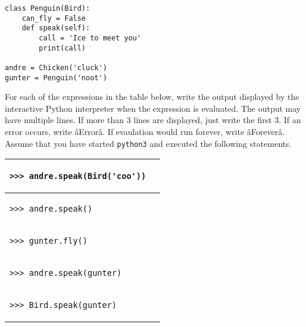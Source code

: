 \documentclass{exam}
\begin{document}
\begin{questions}
\begin{lstlisting}
class Penguin(Bird):
    can_fly = False
    def speak(self):
        call = 'Ice to meet you'
        print(call)

andre = Chicken('cluck')
gunter = Penguin('noot')
\end{lstlisting}
\clearpage
For each of the expressions in the table below, write the output displayed by the interactive Python interpreter when the expression is evaluated. The output may have multiple lines. If more than 3 lines are displayed, just write the first 3. If an error occurs, write âErrorâ. If evaulation would run forever, write âForeverâ.\\
Assume that you have started \texttt{python3} and executed the following statements.

\begin{center}
\begin{tabular}{ |p{8cm}|p{6cm}| } 
 \hline
 \begin{lstlisting}
>>> andre.speak(Bird('coo'))
\end{lstlisting} &  \\  \hline
 \begin{lstlisting}
>>> andre.speak()
\end{lstlisting} &  \\  \hline
 \begin{lstlisting}
>>> gunter.fly()
\end{lstlisting} &  \\  \hline
 \begin{lstlisting}
>>> andre.speak(gunter)
\end{lstlisting} &  \\  \hline
 \begin{lstlisting}
>>> Bird.speak(gunter)
\end{lstlisting} &  \\  \hline
\end{tabular}
\end{center}
\end{questions}
\clearpage
\end{document}
